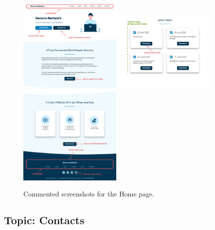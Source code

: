 \documentclass[12pt]{report}
\begin{document}
\begin{figure}[H]
	\centering
	\includegraphics[width=0.45\textwidth]{high_fid_wireframes/home/1.png}
	\includegraphics[width=0.45\textwidth]{high_fid_wireframes/home/2.png}
	\includegraphics[width=0.45\textwidth]{high_fid_wireframes/home/3.png}
	\caption{Commented screenshots for the Home page.}
\end{figure}

\subsection{Topic: Contacts}
\end{document}
